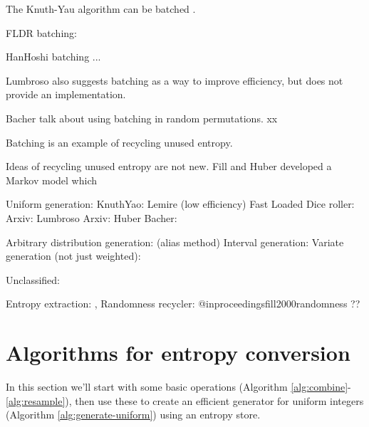 \documentclass[12pt]{article}
\begin{document}
The Knuth-Yau algorithm can be batched \cite{xx}.

FLDR batching: \cite{xx}

HanHoshi batching ...

Lumbroso \cite{lumbroso2013optimal} also suggests batching as a way to improve efficiency, but does not provide an implementation.

Bacher talk about using batching in random permutations. xx

Batching is an example of recycling unused entropy.

Ideas of recycling unused entropy are not new. Fill and Huber \cite{fill2000randomness} developed a Markov model which



Uniform generation:
    KnuthYao: \cite{Knuth1976TheCO}
    Lemire (low efficiency) \cite{lemire2019fast}
    Fast Loaded Dice roller: \cite{saad2020fldr}
    Arxiv: Lumbroso \cite{lumbroso2013optimal}
    Arxiv: Huber \cite{huber2024optimalrollingfairdice}
    Bacher: \cite{bacher2017}
    \cite{baidya24}
    \cite {von1963various}


Arbitrary distribution generation:
    \cite{walker1977efficient} (alias method)
    \cite{vose91}
    \cite{abrahams96}
    Interval generation:
        \cite{han97}
        \cite{watanabe2019}
        \cite{oohama11}
        \cite{oohama2020performance}
    Variate generation (not just weighted):
        \cite{saad2025}
    \cite{roche91}

Unclassified:
    \cite{norman1972computer}
    \cite{stout1984tree}
    \cite{Hoeffding1994}

Entropy extraction:
    \cite{elias1972efficient},
    Randomness recycler: @inproceedings{fill2000randomness}
    \cite{saad24}
    \cite{saad2020optimalsampling}
    \cite{saad2025}
    \cite{norman1972computer}
    \cite{pae15}
    \cite{pae20} ??
    \cite{peres1992iterating}
    \cite{pae06}
    \cite{vembu95}



\section{Algorithms for entropy conversion}

In this section we'll start with some basic operations (Algorithm \ref{alg:combine}-\ref{alg:resample}), then use these to create an efficient generator for uniform integers (Algorithm \ref{alg:generate-uniform}) using an entropy store.
\end{document}
